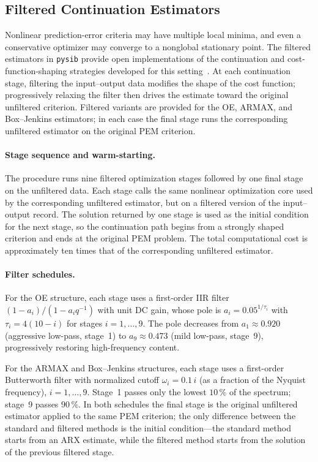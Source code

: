 \documentclass{ifacconf}
\begin{document}
\subsection{Filtered Continuation Estimators}
\label{subsec:filtered-continuation-estimators}

Nonlinear prediction-error criteria may have multiple local minima, and
even a conservative optimizer may converge to a nonglobal stationary point.
The filtered estimators in \texttt{pysib} provide open implementations of
the continuation and cost-function-shaping strategies developed for this
setting~\cite{eckhard2013input,eckhard2017cost}.  At each continuation
stage, filtering the input--output data modifies the shape of the cost
function; progressively relaxing the filter then drives the estimate toward
the original unfiltered criterion.  Filtered variants are provided for the
OE, ARMAX, and Box--Jenkins estimators; in each case the final stage
runs the corresponding unfiltered estimator on the original PEM criterion.

\paragraph*{Stage sequence and warm-starting.}
The procedure runs nine filtered optimization stages followed by one
final stage on the unfiltered data.  Each stage calls the same nonlinear
optimization core used by the corresponding unfiltered estimator, but on a
filtered version of the input--output record.  The solution returned by one
stage is used as the initial condition for the next stage, so the
continuation path begins from a strongly shaped criterion and ends at the
original PEM problem.  The total computational cost is approximately ten
times that of the corresponding unfiltered estimator.

\paragraph*{Filter schedules.}
For the OE structure, each stage uses a first-order IIR filter
$(1-a_i)/(1 - a_i q^{-1})$ with unit DC gain, whose pole is
$a_i = 0.05^{1/\tau_i}$ with $\tau_i = 4(10 - i)$ for stages
$i = 1,\ldots,9$.  The pole decreases from $a_1 \approx 0.920$
(aggressive low-pass, stage~1) to $a_9 \approx 0.473$ (mild
low-pass, stage~9), progressively restoring high-frequency content.

For the ARMAX and Box--Jenkins structures, each stage uses a
first-order Butterworth filter with normalized cutoff
$\omega_i = 0.1\,i$ (as a fraction of the Nyquist frequency),
$i = 1,\ldots,9$.  Stage~1 passes only the lowest $10\,\%$ of the
spectrum; stage~9 passes $90\,\%$.  In both schedules the final stage is the original unfiltered
estimator applied to the same PEM criterion; the only difference
between the standard and filtered methods is the initial
condition---the standard method starts from an ARX estimate,
while the filtered method starts from the solution of the
previous filtered stage.
\end{document}
